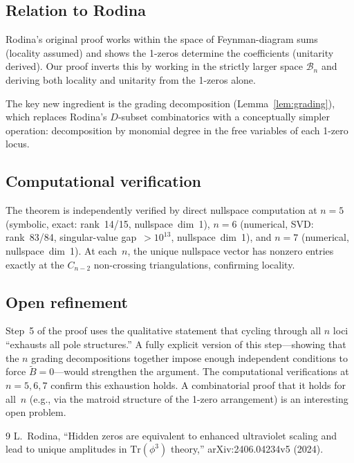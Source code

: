 \documentclass[11pt]{article}
\theoremstyle{plain}
\theoremstyle{definition}
\newcommand{\cB}{\mathcal{B}}
\begin{document}
\subsection{Relation to Rodina}

Rodina's original proof \cite{Rodina2024} works within the space
of Feynman-diagram sums (locality assumed) and shows the 1-zeros
determine the coefficients (unitarity derived). Our proof inverts
this by working in the strictly larger space $\cB_n$ and deriving
both locality and unitarity from the 1-zeros alone.

The key new ingredient is the grading decomposition
(Lemma~\ref{lem:grading}), which replaces Rodina's $D$-subset
combinatorics with a conceptually simpler operation: decomposition
by monomial degree in the free variables of each 1-zero locus.

\subsection{Computational verification}

The theorem is independently verified by direct nullspace computation
at $n=5$ (symbolic, exact: rank~14/15, nullspace~dim~1), $n=6$
(numerical, SVD: rank~83/84, singular-value gap~$>10^{13}$,
nullspace~dim~1), and $n=7$ (numerical, nullspace~dim~1). At each~$n$,
the unique nullspace vector has nonzero entries exactly at the
$C_{n-2}$ non-crossing triangulations, confirming locality.

\subsection{Open refinement}

Step~5 of the proof uses the qualitative statement that cycling
through all $n$ loci ``exhausts all pole structures.'' A fully
explicit version of this step---showing that the $n$ grading
decompositions together impose enough independent conditions to
force $\widetilde{B}=0$---would strengthen the argument. The
computational verifications at $n=5,6,7$ confirm this
exhaustion holds. A combinatorial proof that it holds for all~$n$
(e.g., via the matroid structure of the 1-zero arrangement) is
an interesting open problem.

\begin{thebibliography}{9}
 L.~Rodina, ``Hidden zeros are equivalent to
enhanced ultraviolet scaling and lead to unique amplitudes in
$\mathrm{Tr}(\phi^3)$ theory,'' arXiv:2406.04234v5 (2024).
\end{thebibliography}
\end{document}
